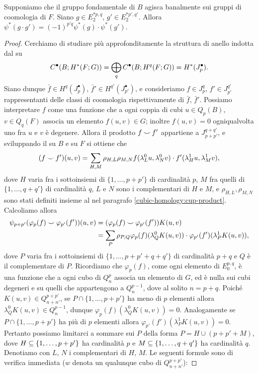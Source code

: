 \begin{proposition}
Supponiamo che il gruppo fondamentale di \(B\) agisca banalmente sui gruppi di coomologia di \(F\). Siano \(g\in E^{\ast p,q}_2\), \(g'\in E^{\ast p',q'}_2\). Allora \(\psi^*(g\cdot g')=(-1)^{p'q}\psi^*(g)\cdot\psi^*(g')\).
\end{proposition}
\begin{proof}
Cerchiamo di studiare più approfonditamente la struttura di anello indotta dal \cupproduct{} su 
\[
C^\bullet(B;H^*(F;G))=\bigoplus_qC^\bullet(B;H^q(F;G))=H^*(J^\bullet_p).
\]
Siano dunque \(\bar{f}\in H^q(J^\bullet_p)\), \(\bar{f}'\in H^{q'}(J^\bullet_{p'})\), e consideriamo \(f\in J^q_p\), \(f'\in J^{q'}_{p'}\) rappresentanti delle classi di coomologia rispettivamente di \(\bar{f}\), \(\bar{f}'\). Possiamo interpretare \(f\) come una funzione che a ogni coppia di cubi \(u\in Q_p(B)\), \(v\in Q_q(F)\) associa un elemento \(f(u,v)\in G\); inoltre \(f(u,v)=0\) ogniqualvolta uno fra \(u\) e \(v\) è degenere. Allora il prodotto \(f\mathbin{\smile} f'\) appartiene a \(J^{q+q'}_{p+p'}\), e sviluppando il \cupproduct{} su \(B\) e su \(F\) si ottiene che
\[
(f\mathbin{\smile} f')(u,v)=\sum_{H,M}\rho_{H,L}\rho_{M,N}f(\lambda^0_Lu,\lambda^0_Nv)\cdot f'(\lambda^1_Hu,\lambda^1_Mv),
\]
dove \(H\) varia fra i sottoinsiemi di \(\{1,\ldots,p+p'\}\) di cardinalità \(p\), \(M\) fra quelli di \(\{1,\ldots,q+q'\}\) di cardinalità \(q\), \(L\) e \(N\) sono i complementari di \(H\) e \(M\), e \(\rho_{H,L},\rho_{M,N}\) sono stati definiti insieme al \cupproduct{} nel paragrafo \ref{cubic-homology:cup-product}. Calcoliamo allora
\begin{align*}
\psi_{p+p'}(\varphi_p(f)\mathbin{\smile}\varphi_{p'}(f'))(u,v)&=(\varphi_p(f)\mathbin{\smile}\varphi_{p'}(f'))K(u,v)\\
&=\sum_P\rho_{P,Q}\varphi_p(f)(\lambda^0_QK(u,v))\cdot\varphi_{p'}(f')(\lambda^1_PK(u,v)),
\end{align*}
dove \(P\) varia fra i sottoinsiemi di \(\{1,\ldots,p+p'+q+q'\}\) di cardinalità \(p+q\) e \(Q\) è il complementare di \(P\). Ricordiamo che \(\varphi_p(f)\), come ogni elemento di \(E^{p,q}_0\), è una funzione che a ogni cubo di \(Q^p_n\) associa un elemento di \(G\), ed è nulla sui cubi degeneri e su quelli che appartengono a \(Q^{p-1}_n\), dove al solito \(n=p+q\). Poiché \(K(u,v)\in Q^{p+p'}_{n+n'}\), se \(P\cap\{1,\ldots,p+p'\}\) ha meno di \(p\) elementi allora \(\lambda^0_QK(u,v)\in Q^{p-1}_{n}\), dunque \(\varphi_{p}(f)(\lambda^0_QK(u,v))=0\). Analogamente se \(P\cap\{1,\ldots,p+p'\}\) ha più di \(p\) elementi allora \(\varphi_{p'}(f')(\lambda^1_PK(u,v))=0\). Pertanto possiamo limitarci a sommare sui \(P\) della forma \(P=H\cup(p+p'+M)\), dove \(H\subseteq\{1,\ldots,p+p'\}\) ha cardinalità \(p\) e \(M\subseteq\{1,\ldots,q+q'\}\) ha cardinalità \(q\). Denotiamo con \(L\), \(N\) i complementari di \(H\), \(M\). Le seguenti formule sono di verifica immediata (\(w\) denota un qualunque cubo di \(Q^{p+p'}_{n+n'}\)):

\end{proof}
